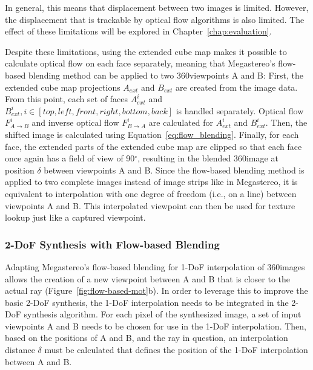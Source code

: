 In general, this means that displacement between two images is limited. However, the displacement that is trackable by optical flow algorithms is also limited. The effect of these limitations will be explored in Chapter~\ref{chap:evaluation}.

Despite these limitations, using the extended cube map makes it possible to calculate optical flow on each face separately, meaning that Megastereo's flow-based blending method can be applied to two 360\degree viewpoints A and B: First, the extended cube map projections $A_{ext}$ and $B_{ext}$ are created from the image data. From this point, each set of faces $A_{ext}^{i}$ and $B_{ext}^{i}, i \in [top, left, front, right, bottom, back]$ is handled separately. Optical flow $F_{A\to B}^i$ and inverse optical flow $F_{B\to A}^i$ are calculated for $A_{ext}^{i}$ and $B_{ext}^{i}$. Then, the shifted image is calculated using Equation~\ref{eq:flow_blending}. Finally, for each face, the extended parts of the extended cube map are clipped so that each face once again has a field of view of 90$^{\circ}$, resulting in the blended 360\degree image at position $\delta$ between viewpoints A and B. Since the flow-based blending method is applied to two complete images instead of image strips like in Megastereo, it is equivalent to interpolation with one degree of freedom (i.e., on a line) between viewpoints A and B. This interpolated viewpoint can then be used for texture lookup just like a captured viewpoint.

\subsubsection{2-DoF Synthesis with Flow-based Blending} \label{subsec:2dof_flow-based}
Adapting Megastereo's flow-based blending for 1-DoF interpolation of 360\degree images allows the creation of a new viewpoint between A and B that is closer to the actual ray (Figure~\ref{fig:flow-based-mot}b). In order to leverage this to improve the basic 2-DoF synthesis, the 1-DoF interpolation needs to be integrated in the 2-DoF synthesis algorithm. For each pixel of the synthesized image, a set of input viewpoints A and B needs to be chosen for use in the 1-DoF interpolation. Then, based on the positions of A and B, and the ray in question, an interpolation distance $\delta$ must be calculated that defines the position of the 1-DoF interpolation between A and B.

